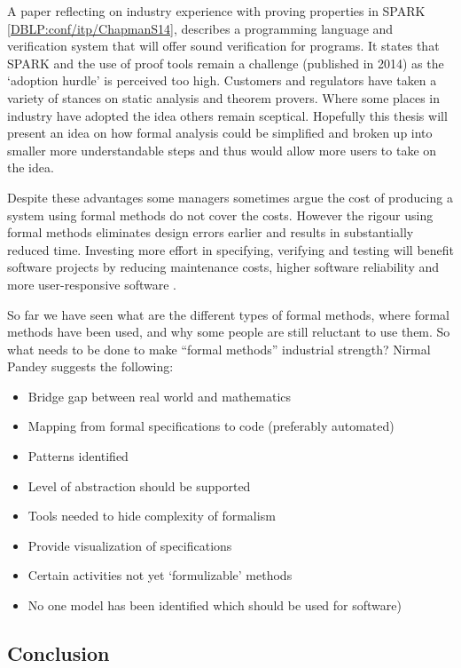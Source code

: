 A paper reflecting on industry experience with proving properties in SPARK \ref{DBLP:conf/itp/ChapmanS14}, describes a programming language and verification system that will offer sound verification for programs. It states that SPARK and the use of proof tools remain a challenge (published in 2014) as the `adoption hurdle' is perceived too high. Customers and regulators have taken a variety of stances on static analysis and theorem provers. Where some places in industry have adopted the idea others remain sceptical. Hopefully this thesis will present an idea on how formal analysis could be simplified and broken up into smaller more understandable steps and thus would allow more users to take on the idea.

Despite these advantages some managers sometimes argue the cost of producing a system using formal methods do not cover the costs. However the rigour using formal methods eliminates design errors earlier and results in substantially reduced time. Investing more effort in specifying, verifying and testing will benefit software projects by reducing maintenance costs, higher software reliability and more user-responsive software \cite{chantatub}.

So far we have seen what are the different types of formal methods, where formal methods have been used, and why some people are still reluctant to use them. So what needs to be done to make “formal methods” industrial strength? Nirmal Pandey \cite{formalmethodslides} suggests the following: 

\begin{itemize}
\item Bridge gap between real world and mathematics
\item Mapping from formal specifications to code (preferably automated)
\item Patterns identified
\item Level of abstraction should be supported
\item Tools needed to hide complexity of formalism
\item Provide visualization of specifications 
\item Certain activities not yet ‘formulizable’ methods
\item No one model has been identified which should be used for software)
\end{itemize}


\subsection{Conclusion}

